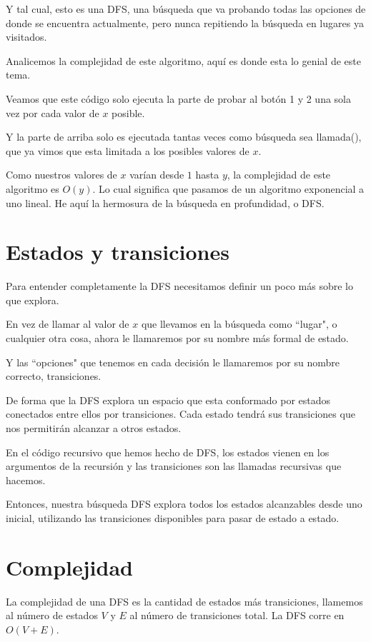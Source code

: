 Y tal cual, esto es una DFS, una búsqueda que va probando todas las opciones de donde se encuentra actualmente, pero nunca repitiendo la búsqueda en lugares ya visitados.

Analicemos la complejidad de este algoritmo, aquí es donde esta lo genial de este tema.

Veamos que este código solo ejecuta la parte de probar al botón 1 y 2 una sola vez por cada valor de \(x\) posible.

Y la parte de arriba solo es ejecutada tantas veces como búsqueda sea llamada(), que ya vimos que esta limitada a los posibles valores de \(x\).

Como nuestros valores de \(x\) varían desde \(1\) hasta \(y\), la complejidad de este algoritmo es \(O(y)\). Lo cual significa que pasamos de un algoritmo exponencial a uno lineal. He aquí la hermosura de la búsqueda en profundidad, o DFS.

\section{Estados y transiciones}
Para entender completamente la DFS necesitamos definir un poco más sobre lo que explora.

En vez de llamar al valor de \(x\) que llevamos en la búsqueda como ``lugar", o cualquier otra cosa, ahora le llamaremos por su nombre más formal de estado.

Y las ``opciones" que tenemos en cada decisión le llamaremos por su nombre correcto, transiciones.

De forma que la DFS explora un espacio que esta conformado por estados conectados entre ellos por transiciones. Cada estado tendrá sus transiciones que nos permitirán alcanzar a otros estados.

En el código recursivo que hemos hecho de DFS, los estados vienen en los argumentos de la recursión y las transiciones son las llamadas recursivas que hacemos.

Entonces, nuestra búsqueda DFS explora todos los estados alcanzables desde uno inicial, utilizando las transiciones disponibles para pasar de estado a estado.

\section{Complejidad}
La complejidad de una DFS es la cantidad de estados más transiciones, llamemos al número de estados \(V\) y \(E\) al número de transiciones total. La DFS corre en \(O(V+E)\).

